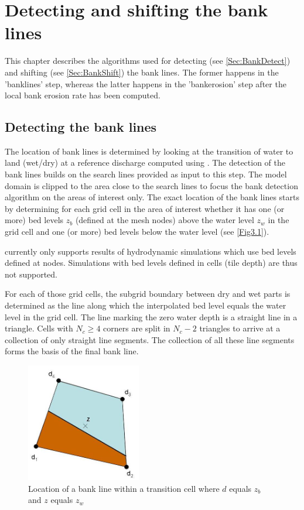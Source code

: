 \chapter{Detecting and shifting the bank lines} \label{Chp:BankDetect}

This chapter describes the algorithms used for detecting (see \autoref{Sec:BankDetect}) and shifting (see \autoref{Sec:BankShift}) the bank lines.
The former happens in the 'banklines' step, whereas the latter happens in the 'bankerosion' step after the local bank erosion rate has been computed.

\section{Detecting the bank lines} \label{Sec:BankDetect}

The location of bank lines is determined by looking at the transition of water to land (wet/dry) at a reference discharge computed using \dflowfm.
The detection of the bank lines builds on the search lines provided as input to this step.
The model domain is clipped to the area close to the search lines to focus the bank detection algorithm on the areas of interest only.
The exact location of the bank lines starts by determining for each grid cell in the area of interest whether it has one (or more) bed levels $z_b$ (defined at the mesh nodes) above the water level $z_w$ in the grid cell and one (or more) bed levels below the water level (see \autoref{Fig3.1}).

\Note \dfastbe currently only supports results of hydrodynamic simulations which use bed levels defined at nodes.
Simulations with bed levels defined in cells (tile depth) are thus not supported.

For each of those grid cells, the subgrid boundary between dry and wet parts is determined as the line along which the interpolated bed level equals the water level in the grid cell.
The line marking the zero water depth is a straight line in a triangle.
Cells with $N_c \ge 4$ corners are split in $N_c - 2$ triangles to arrive at a collection of only straight line segments.
The collection of all these line segments forms the basis of the final bank line.

\begin{figure}
\includegraphics[width=5cm]{figures/Fig3-1.png}
\caption{Location of a bank line within a transition cell where $d$ equals $z_b$ and $z$ equals $z_w$}
\label{Fig3.1}
\end{figure}

